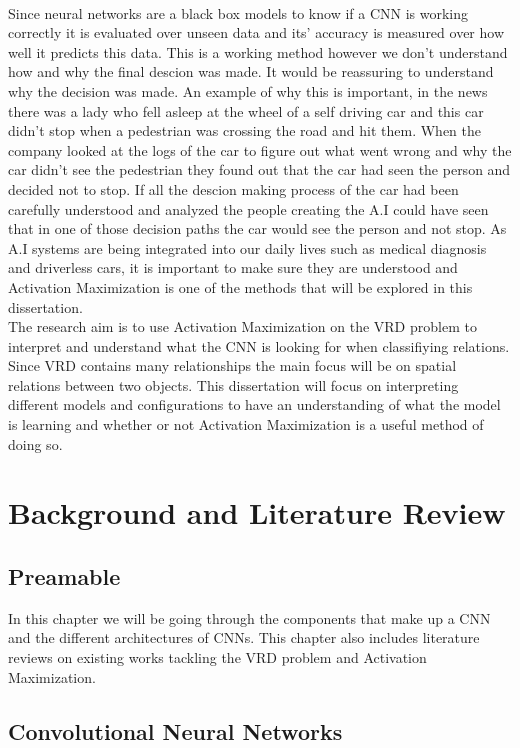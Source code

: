 \documentclass{csfyp}
\newcommand\tab[1][1cm]{\hspace*{#1}}
\begin{document}
\\
\tab
Since neural networks are a black box models to know if a CNN is working correctly it is evaluated over unseen data and its’ accuracy is measured over how well it predicts this data. This is a working method however we don't understand how and why the final descion was made. It would be reassuring to understand why the decision was made. An example of why this is important, in the news there was a lady who fell asleep at the wheel of a self driving car and this car didn’t stop when a pedestrian was crossing the road and hit them. When the company looked at the logs of the car to figure out what went wrong and why the car didn’t see the pedestrian they found out that the car had seen the person and decided not to stop. If all the descion making process of the car had been carefully understood and analyzed the people creating the A.I could have seen that in one of those decision paths the car would see the person and not stop. As A.I systems are being integrated into our daily lives such as medical diagnosis and driverless cars, it is important to make sure they are understood and Activation Maximization is one of the methods that will be explored in this dissertation.
\\
\tab
The research aim is to use Activation Maximization on the VRD problem to interpret and understand what the CNN is looking for when classifiying relations. Since VRD contains many relationships the main focus will be on spatial relations between two objects. This dissertation will focus on interpreting different models and configurations to have an understanding of what the model is learning and whether or not Activation Maximization is a useful method of doing so.

\section{Background and Literature Review}
\subsection{Preamable}
In this chapter we will be going through the components that make up a CNN and the different architectures of CNNs. This chapter also includes literature reviews on existing works tackling the VRD problem and Activation Maximization.

\subsection{Convolutional Neural Networks}
\end{document}
